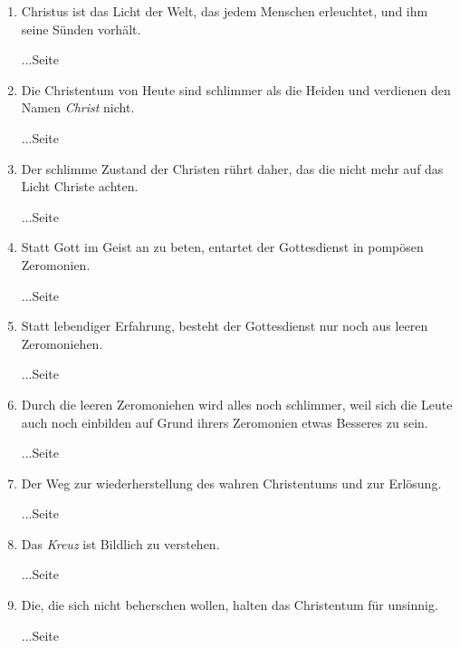 \begin{enumerate}
 \item Christus ist das Licht der Welt, das jedem Menschen erleuchtet, und ihm seine Sünden vorhält.
 \begin{flushright}...Seite \pageref{ref:02_03_gott_in_jedem}\end{flushright}
 \item Die Christentum von Heute sind schlimmer als die Heiden und verdienen den Namen \textit{Christ} nicht.
 \begin{flushright}...Seite \pageref{ref:02_08_schlimmer_als_heiden}\end{flushright}
 \item Der schlimme Zustand der Christen rührt daher, das die nicht mehr auf das Licht Christe achten.
 \begin{flushright}...Seite \pageref{ref:02_08_ursache_des_abfalls}\end{flushright}
 \item Statt Gott im Geist an zu beten, entartet der Gottesdienst in pompösen Zeromonien.
 \begin{flushright}...Seite \pageref{ref:02_08_falscher_gottesdienst} \end{flushright}
 \item Statt lebendiger Erfahrung, besteht der Gottesdienst nur noch aus leeren Zeromoniehen.
 \begin{flushright}...Seite \pageref{ref:02_09_lebendige_erfahrung}\end{flushright}
 \item Durch die leeren Zeromoniehen wird alles noch schlimmer, weil sich die Leute auch noch einbilden auf Grund ihrers Zeromonien etwas Besseres zu sein.
 \begin{flushright}...Seite \pageref{ref:02_09_selbstueberschaetzung}\end{flushright}
 \item Der Weg zur wiederherstellung des wahren Christentums und zur Erlösung.
 \begin{flushright}...Seite \pageref{ref:02_10_abhilfe}\end{flushright}
 \item Das \textit{Kreuz} ist Bildlich zu verstehen.
 \begin{flushright}...Seite \pageref{ref:03_01_das_kreuz}\end{flushright}
 \item Die, die sich nicht beherschen wollen, halten das Christentum für unsinnig.
 \begin{flushright}...Seite \pageref{ref:03_02_leidenschaft}\end{flushright}

\end{enumerate}
